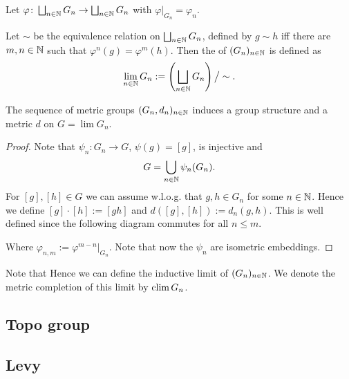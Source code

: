 Let $\varphi\colon\bigsqcup_{n\in\mathbb{N}} G_n\to\bigsqcup_{n\in\mathbb{N}} G_n$ with $\varphi|_{G_n}=\varphi_n$.
\begin{definition}
Let $\sim$ be the equivalence relation on $\bigsqcup_{n\in\mathbb{N}} G_n$, defined by $g\sim h$ iff there are $m,n\in\mathbb{N}$ such that $\varphi^n(g)=\varphi^m(h)$.
Then the  of $(G_n)_{n\in\mathbb{N}}$ is defined as
\[\lim_{n\in\mathbb{N}} G_n:=\left(\bigsqcup_{n\in\mathbb{N}} G_n\right)\big/\sim.\]
\end{definition}
\begin{lemma}
The sequence of metric groups $(G_n,d_n)_{n\in\mathbb{N}}$ induces a group structure and a metric $d$ on $G=\lim G_n$. 
\end{lemma}
\begin{proof}
Note that $\psi_n\colon G_n\to G$, $\psi(g)=[g]$, is injective and \[G=\bigcup_{n\in\mathbb{N}}\psi_n(G_n).\]
For $[g], [h]\in G$ we can assume w.l.o.g. that $g,h\in G_n$ for some $n\in\mathbb{N}$. Hence we define $[g]\cdot[h]:=[gh]$ and $d([g],[h]):=d_n(g,h)$. This is well defined since the following diagram commutes for all $n\leq m$.
\begin{center}
\end{center}
Where $\varphi_{n,m}:=\varphi^{m-n}|_{G_n}$. Note that now the $\psi_n$ are isometric embeddings.
\end{proof}


Note that Hence we can define the inductive limit of $(G_n)_{n\in\mathbb{N}}$. We denote the metric completion of this limit by $\operatorname{clim} G_n$.%
\subsection*{Topo group}
\subsection*{Levy}




